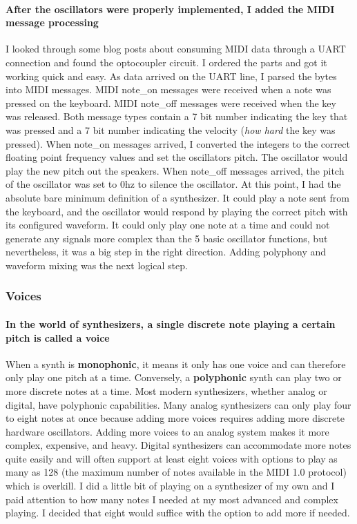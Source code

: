 \documentclass[acmlarge,screen]{acmart}
\begin{document}
	\paragraph{After the oscillators were properly implemented, I added the MIDI message processing} I looked through some blog posts about consuming MIDI data through a UART connection and found the optocoupler circuit. I ordered the parts and got it working quick and easy. As data arrived on the UART line, I parsed the bytes into MIDI messages. MIDI note\_on messages were received when a note was pressed on the keyboard. MIDI note\_off messages were received when the key was released. Both message types contain a 7 bit number indicating the key that was pressed and a 7 bit number indicating the velocity (\textit{how hard} the key was pressed). When note\_on messages arrived, I converted the integers to the correct floating point frequency values and set the oscillators pitch. The oscillator would play the new pitch out the speakers. When note\_off messages arrived, the pitch of the oscillator was set to 0hz to silence the oscillator. At this point, I had the absolute bare minimum definition of a synthesizer. It could play a note sent from the keyboard, and the oscillator would respond by playing the correct pitch with its configured waveform. It could only play one note at a time and could not generate any signals more complex than the 5 basic oscillator functions, but nevertheless, it was a big step in the right direction. Adding polyphony and waveform mixing was the next logical step.

	\subsubsection{Voices}
	\paragraph{In the world of synthesizers, a single discrete note playing a certain pitch is called a voice} When a synth is \textbf{monophonic}, it means it only has one voice and can therefore only play one pitch at a time. Conversely, a \textbf{polyphonic} synth can play two or more discrete notes at a time. Most modern synthesizers, whether analog or digital, have polyphonic capabilities. Many analog synthesizers can only play four to eight notes at once because adding more voices requires adding more discrete hardware oscillators. Adding more voices to an analog system makes it more complex, expensive, and heavy. Digital synthesizers can accommodate more notes quite easily and will often support at least eight voices with options to play as many as 128 (the maximum number of notes available in the MIDI 1.0 protocol) which is overkill. I did a little bit of playing on a synthesizer of my own and I paid attention to how many notes I needed at my most advanced and complex playing. I decided that eight would suffice with the option to add more if needed.
	
\end{document}
